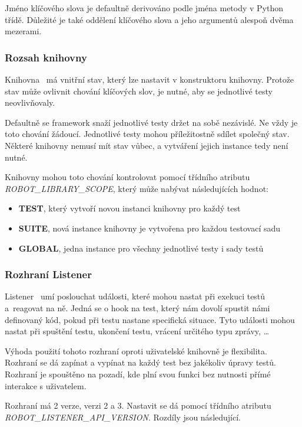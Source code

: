 Jméno klíčového slova je defaultně derivováno podle jména metody v Python třídě. Důležité je také oddělení klíčového slova a jeho argumentů alespoň dvěma mezerami.

\subsubsection{Rozsah knihovny}

Knihovna~\cite{robotframeworkUserGuide} má vnitřní stav, který lze nastavit v konstruktoru knihovny. Protože stav může ovlivnit chování klíčových slov, je nutné, aby se jednotlivé testy neovlivňovaly.

Defaultně se framework snaží jednotlivé testy držet na sobě nezávislé. Ne vždy je toto chování žádoucí. Jednotlivé testy mohou příležitostně sdílet společný stav. Některé knihovny nemusí mít stav vůbec, a vytváření jejich instance tedy není nutné.

Knihovny mohou toto chování kontrolovat pomocí třídního atributu \textit{ROBOT\_LIBRARY\_SCOPE}, který může nabývat následujících hodnot:

\begin{itemize}
    \item \textbf{TEST}, který vytvoří novou instanci knihovny pro každý test
    \item \textbf{SUITE}, nová instance knihovny je vytvořena pro každou testovací sadu
    \item \textbf{GLOBAL}, jedna instance pro všechny jednotlivé testy i sady testů
\end{itemize}

\subsubsection{Rozhraní Listener}

Listener~\cite{robotframeworkListener} umí poslouchat události, které mohou nastat při exekuci testů a~reagovat na ně. Jedná se o hook na test, který nám dovolí spustit námi definovaný kód, pokud při testu nastane specifická situace. Tyto události mohou nastat při spuštění testu, ukončení testu, vrácení určitého typu zprávy, \dots

Výhoda použití tohoto rozhraní oproti uživatelské knihovně je flexibilita. Rozhraní se dá zapínat a vypínat na každý test bez jakékoliv úpravy testů. Rozhraní je spouštěno na pozadí, kde plní svou funkci bez nutnosti přímé interakce s uživatelem.

Rozhraní má 2 verze, verzi 2 a 3. Nastavit se dá pomocí třídního atributu \textit{ROBOT\_LISTENER\_API\_VERSION}. Rozdíly jsou následující.


